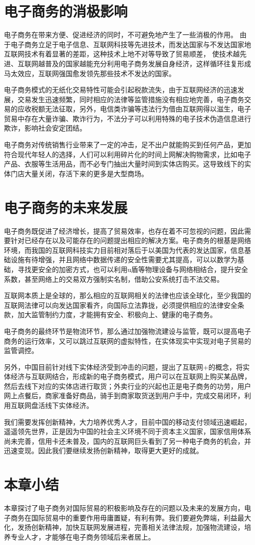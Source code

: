 \section{电子商务的消极影响}

电子商务在带来方便、促进经济的同时，不可避免地产生了一些消极的作用。
由于电子商务立足于电子信息、互联网科技等先进技术，而发达国家与不发达国家地互联网技术有着显著的差距，这种技术上地不对等导致了贸易顺差，
使技术越先进、互联网越普及的国家越能充分利用电子商务发展自身经济，这样循环往复形成马太效应，互联网强国愈发领先那些技术不发达的国家。

电子商务模式的无纸化交易特性可能会引起税款流失，由于互联网经济的迅速发展，交易发生迅速频繁，同时相应的法律等监管措施没有相应地完善，电子商务交易的应收税额无法征取，另外，电信类诈骗等违法行为借由互联网得以滋生，电子贸易中存在大量诈骗、欺诈行为，不法分子可以利用特殊的电子技术伪造信息进行欺诈，影响社会安定团结。

电子商务对传统销售行业带来了一定的冲击，足不出户就能购买到任何产品，更加符合现代年轻人的选择，人们可以利用碎片化的时间上网解决购物需求，比如电子产品、衣服等生活用品，而不必专门抽出大量时间到实体店购买。这导致线下的实体门店大量关闭，存活下来的更多是大型商场。
\section{电子商务的未来发展}
电子商务既促进了经济增长，提高了贸易效率，也存在着不可忽视的问题，因此需要针对已经存在以及可能存在的问题提出相应的解决方案。电子商务的根基是网络环境，而我国的互联网科技实力目前相对落后于以美国为代表的发达国家，信息基础设施有待增强，并且网络中数据传递的安全性需要尤其提高，可以以数学为基础，寻找更安全的加密方式，也可以利用u盾等物理设备与网络相结合，提升安全系数，甚至网络上的交易双方强制实名制，借助公安系统打击不法交易。

互联网本质上是全球的，那么相应的互联网相关的法律也应该全球化，至少我国的互联网法律可以向发达国家看齐，向国际立法靠拢，必须提供相应的法律安全条款，加大监管制约力度，才能拥有安全、积极向上、健康的电子商务。

电子商务的最终环节是物流环节，那么通过加强物流建设与监管，既可以提高电子商务的运行效率，又可以跳过互联网的虚拟特性，在实体现实中实现对电子贸易的监管调控。

另外，中国目前针对线下实体经济受到冲击的问题，提出了互联网+的概念，将实体经济与互联网结合，形成新的电子商务模式，用户可以在互联网上购买某品牌，然后去线下对应的实体店进行取货；外卖行业的兴起也正是电子商务的功劳，用户网上点餐后，商家准备好商品，骑手到商家取货送到用户手中，完成交易闭环，利用互联网盘活线下实体经济。

我们需要发挥创新精神，大力培养优秀人才，目前中国的移动支付领域迅速崛起，遥遥领先世界，正是因为中国的社会主义环境不同于资本主义国家，国家信用体系尚未完善，信用卡还未普及，国内的互联网巨头看到了另一种电子商务的机会，并迅速变现。因此我们要继续发扬创新精神，取得更大更好的成就。
\section{本章小结}
本章探讨了电子商务对国际贸易的积极影响及存在的问题以及未来的发展方向，电子商务在国际贸易中的重要作用毋庸置疑，有利有弊。我们要避免弊端，利益最大化，发扬创新精神，加快互联网发展进程，完善相关法律法规，加强物流建设，培养专业人才，才能够在电子商务领域后来者居上。